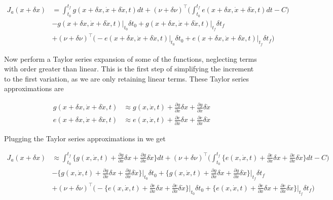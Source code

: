 \documentclass[11pt,letterpaper,onecolumn,notitlepage]{article}
\begin{document}
\begin{align*}
  J_{a}(x+\delta x)&=
  \int_{t_{0}}^{t_{f}}g(x+\delta x,\dot{x}+\delta\dot{x},t)dt
  +(\nu+\delta\nu)^{\top}\biggr(\int_{t_{0}}^{t_{f}}e(x+\delta x,\dot{x}+\delta\dot{x},t)dt-C\biggr) \\
  &-g(x+\delta x,\dot{x}+\delta\dot{x},t)\bigr|_{t_{0}}\delta t_{0}
  +g(x+\delta x,\dot{x}+\delta\dot{x},t)\bigr|_{t_{f}}\delta t_{f} \\
  &+(\nu+\delta\nu)^{\top}\biggr(
  -e(x+\delta x,\dot{x}+\delta\dot{x},t)\bigr|_{t_{0}}\delta t_{0}
  +e(x+\delta x,\dot{x}+\delta\dot{x},t)\bigr|_{t_{f}}\delta t_{f}
  \biggr)
\end{align*}

Now perform a Taylor series expansion of some of the functions, neglecting terms with order greater than linear.
This is the first step of simplifying the increment to the first variation, as we are only retaining linear terms.
These Taylor series approximations are

\begin{align*}
  g(x+\delta x,\dot{x}+\delta\dot{x},t)&\approx g(x,\dot{x},t)+\frac{\partial{}g}{\partial{}x}\delta x+\frac{\partial{}g}{\partial\dot{x}}\delta\dot{x} \\
  e(x+\delta x,\dot{x}+\delta\dot{x},t)&\approx e(x,\dot{x},t)+\frac{\partial{}e}{\partial{}x}\delta x+\frac{\partial{}e}{\partial\dot{x}}\delta\dot{x}
\end{align*}

Plugging the Taylor series approximations in we get

\begin{align*}
  J_{a}(x+\delta x)&\approx
  \int_{t_{0}}^{t_{f}}\biggr\{g(x,\dot{x},t)+\frac{\partial{}g}{\partial{}x}\delta x+\frac{\partial{}g}{\partial\dot{x}}\delta\dot{x}\biggr\}dt
  +(\nu+\delta\nu)^{\top}\biggr(\int_{t_{0}}^{t_{f}}\biggr\{e(x,\dot{x},t)+\frac{\partial{}e}{\partial{}x}\delta x+\frac{\partial{}e}{\partial\dot{x}}\delta\dot{x}\biggr\}dt-C\biggr) \\
  &-\biggr\{g(x,\dot{x},t)+\frac{\partial{}g}{\partial{}x}\delta x+\frac{\partial{}g}{\partial\dot{x}}\delta\dot{x}\biggr\}\biggr|_{t_{0}}\delta t_{0}
  +\biggr\{g(x,\dot{x},t)+\frac{\partial{}g}{\partial{}x}\delta x+\frac{\partial{}g}{\partial\dot{x}}\delta\dot{x}\biggr\}\biggr|_{t_{f}}\delta t_{f} \\
  &+(\nu+\delta\nu)^{\top}\biggr(
  -\biggr\{e(x,\dot{x},t)+\frac{\partial{}e}{\partial{}x}\delta x+\frac{\partial{}e}{\partial\dot{x}}\delta\dot{x}\biggr\}\biggr|_{t_{0}}\delta t_{0}
  +\biggr\{e(x,\dot{x},t)+\frac{\partial{}e}{\partial{}x}\delta x+\frac{\partial{}e}{\partial\dot{x}}\delta\dot{x}\biggr\}\biggr|_{t_{f}}\delta t_{f}
  \biggr)
\end{align*}
\end{document}
